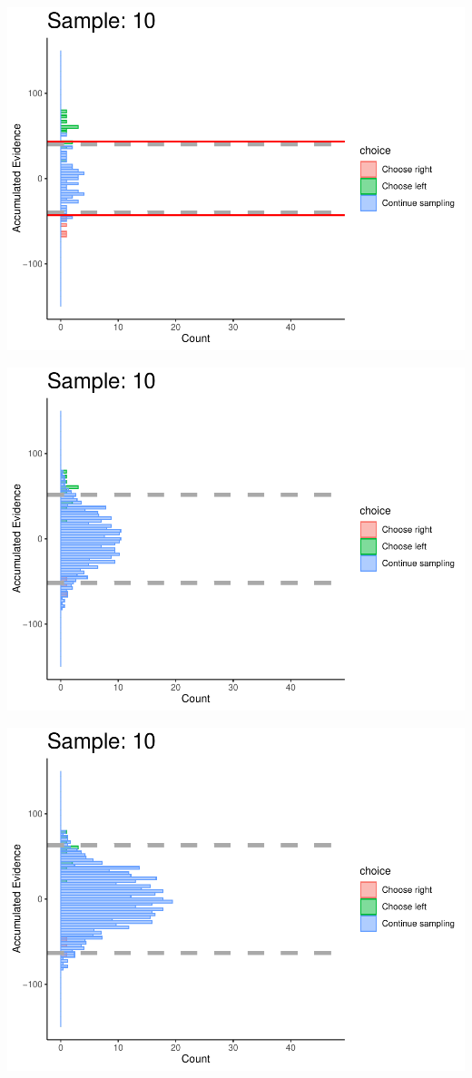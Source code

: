 \documentclass[
]{book}
\begin{document}
\begin{center}\includegraphics[width=0.8\linewidth]{LateNightBayes_files/figure-latex/collapsing_dcb-95} \end{center}

\begin{center}\includegraphics[width=0.8\linewidth]{LateNightBayes_files/figure-latex/collapsing_dcb-96} \end{center}

\begin{center}\includegraphics[width=0.8\linewidth]{LateNightBayes_files/figure-latex/collapsing_dcb-97} \end{center}
\end{document}
